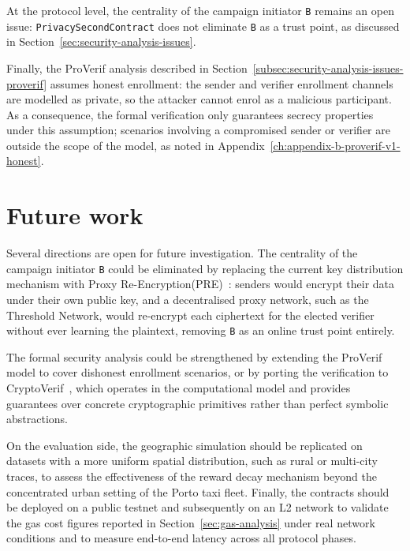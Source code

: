 At the protocol level, the centrality of the campaign initiator \texttt{B} remains
an open issue: \texttt{PrivacySecondContract} does not eliminate \texttt{B} as a
trust point, as discussed in Section~\ref{sec:security-analysis-issues}.

Finally, the ProVerif analysis described in Section~\ref{subsec:security-analysis-issues-proverif} assumes
honest enrollment: the sender and verifier enrollment channels are modelled
as private, so the attacker cannot enrol as a malicious participant.
As a consequence, the formal verification only guarantees secrecy properties
under this assumption; scenarios involving a compromised sender or verifier
are outside the scope of the model, as noted in Appendix~\ref{ch:appendix-b-proverif-v1-honest}.

\section{Future work}\label{sec:conclusion-future-work}

Several directions are open for future investigation.
The centrality of the campaign initiator \texttt{B} could be eliminated by replacing
the current key distribution mechanism with Proxy Re-Encryption(PRE)~\cite{ateniese2006pre}: senders
would encrypt their data under their own public key, and a decentralised proxy
network, such as the Threshold Network\cite{thresholdnetwork}, would re-encrypt each ciphertext
for the elected verifier without ever learning the plaintext, removing \texttt{B} as
an online trust point entirely.

The formal security analysis could be strengthened by extending the ProVerif
model to cover dishonest enrollment scenarios, or by porting the verification
to CryptoVerif~\cite{blanchet2008cryptoverif}, which operates in the computational model and provides
guarantees over concrete cryptographic primitives rather than perfect symbolic
abstractions.

On the evaluation side, the geographic simulation should be replicated on
datasets with a more uniform spatial distribution, such as rural or
multi-city traces, to assess the effectiveness of the reward decay mechanism
beyond the concentrated urban setting of the Porto taxi fleet.
Finally, the contracts should be deployed on a public testnet and subsequently
on an L2 network to validate the gas cost figures reported in
Section~\ref{sec:gas-analysis} under real network conditions and to measure
end-to-end latency across all protocol phases.